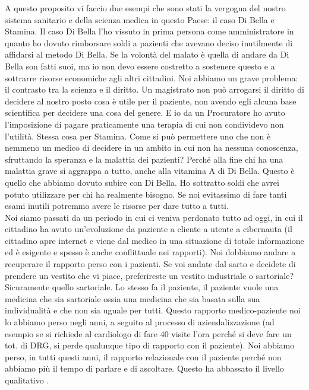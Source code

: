 A questo proposito vi faccio due esempi che sono stati la vergogna del
nostro sistema sanitario e della scienza medica in questo Paese: il caso
Di Bella e Stamina. Il caso Di Bella l'ho vissuto in prima persona come
amministratore in quanto ho dovuto rimborsare soldi a pazienti che
avevano deciso inutilmente di affidarsi al metodo Di Bella. Se la
volontà del malato è quella di andare da Di Bella son fatti suoi, ma io
non devo essere costretto a sostenere questo e a sottrarre risorse
economiche agli altri cittadini. Noi abbiamo un grave problema: il
contrasto tra la scienza e il diritto. Un magistrato non può arrogarsi
il diritto di decidere al nostro posto cosa è utile per il paziente, non
avendo egli alcuna base scientifica per decidere una cosa del genere. E
io da un Procuratore ho avuto l'imposizione di pagare praticamente una
terapia di cui non condividevo non l'utilità. Stessa cosa per Stamina.
Come si può permettere uno che non è nemmeno un medico di decidere in un
ambito in cui non ha nessuna conoscenza, sfruttando la speranza e la
malattia dei pazienti? Perché alla fine chi ha una malattia grave si
aggrappa a tutto, anche alla vitamina A di Di Bella. Questo è quello che
abbiamo dovuto subire con Di Bella. Ho sottratto soldi che avrei potuto
utilizzare per chi ha realmente bisogno. Se noi evitassimo di fare tanti
esami inutili potremmo avere le risorse per dare tutto a tutti.
\\
Noi siamo passati da un periodo in cui ci veniva perdonato tutto ad
oggi, in cui il cittadino ha avuto un'evoluzione da paziente a cliente a
utente a cibernauta (il cittadino apre internet e viene dal medico in
una situazione di totale informazione ed è esigente e spesso è anche
conflittuale nei rapporti). Noi dobbiamo andare a recuperare il rapporto
perso con i pazienti. Se voi andate dal sarto e decidete di prendere un
vestito che vi piace, preferireste un vestito industriale o sartoriale?
Sicuramente quello sartoriale. Lo stesso fa il paziente, il paziente
vuole una medicina che sia sartoriale ossia una medicina che sia basata
sulla sua individualità e che non sia uguale per tutti. Questo rapporto
medico-paziente noi lo abbiamo perso negli anni, a seguito al processo
di aziendalizzazione (ad esempio se si richiede al cardiologo di fare 40
visite l'ora perché si deve fare un tot. di DRG, si perde qualunque tipo
di rapporto con il paziente). Noi abbiamo perso, in tutti questi anni,
il rapporto relazionale con il paziente perché non abbiamo più il tempo
di parlare e di ascoltare. Questo ha abbassato il livello qualitativo .
\\
